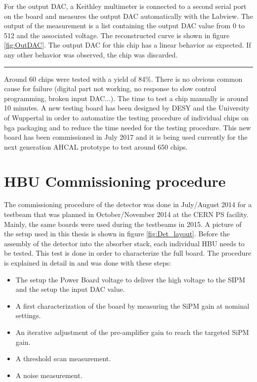 For the output DAC, a Keithley multimeter is connected to a second serial port on the board and measures the output DAC automatically with the Labview. The output of the measurement is a list containing the output DAC value from 0 to 512 and the associated voltage. The reconstructed curve is shown in figure \ref{fig:OutDAC}. The output DAC for this chip has a linear behavior as expected. If any other behavior was observed, the chip was discarded.

\begin{center}
  \rule{0.5\textwidth}{.4pt}
\end{center}

Around 60 chips were tested with a yield of 84\%. There is no obvious common cause for failure (digital part not working, no response to slow control programming, broken input DAC...). The time to test a chip manually is around 10 minutes. A new testing board has been designed by DESY and the University of Wuppertal in order to automatize the testing procedure of individual chips on \acrshort{bga} packaging \cite{AHCALMain2016_Amine} and to reduce the time needed for the testing procedure. This new board has been commissioned in July 2017 and it is being used currently for the next generation AHCAL prototype to test around 650 chips.

\section{HBU Commissioning procedure}

The commissioning procedure of the detector was done in July/August 2014 for a testbeam that was planned in October/November 2014 at the CERN PS facility. Mainly, the same boards were used during the testbeams in 2015. A picture of the setup used in this thesis is shown in figure \ref{fig:Det_layout}. Before the assembly of the detector into the absorber stack, each individual HBU needs to be tested. This test is done in order to characterize the full board. The procedure is explained in detail in \cite{Hartbrich2012} and was done with these steps:

\begin{itemize}
  \item The setup the Power Board voltage to deliver the high voltage to the SIPM and the setup the input DAC value.
  \item A first characterization of the board by measuring the SiPM gain at nominal settings.
  \item An iterative adjustment of the pre-amplifier gain to reach the targeted SiPM gain.
  \item A threshold scan measurement.
  \item A noise measurement.
\end{itemize}

